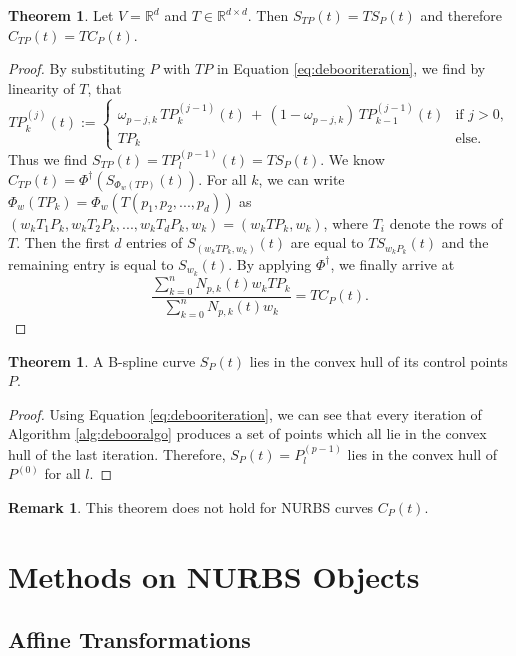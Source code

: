 \documentclass[a4paper, 11pt]{report}
\theoremstyle{definition}
\newtheorem{theorem}[definition]{Theorem}
\newtheorem*{remark}{Remark}
\begin{document}
\begin{theorem}
	Let $V = \mathbb{R}^d$ and $T \in \mathbb{R}^{d \times d}$. Then $S_{TP}(t) = TS_P(t)$ and therefore $C_{TP}(t) = TC_P(t)$.
\end{theorem}
\begin{proof}
	By substituting $P$ with $TP$ in Equation \ref{eq:debooriteration}, we find by linearity of $T$, that
		\begin{equation*}
			TP^{(j)}_k(t) := \begin{cases}
				\omega_{p-j, k} \, TP^{(j-1)}_k(t) \, + \, (1-\omega_{p-j, k}) \, TP^{(j-1)}_{k-1}(t) 	&\text{if } j > 0,\\
				TP_k 																					&\text{else}.
			\end{cases}
		\end{equation*}
	Thus we find $S_{TP}(t) = TP^{(p-1)}_l(t) = TS_P(t)$. We know $C_{TP}(t) = \Phi^\dagger(S_{\Phi_w(TP)}(t))$. For all $k$, we can write $\Phi_w(TP_k) = \Phi_w(T(p_1, p_2, ..., p_d))$ as $(w_kT_1P_k, w_kT_2P_k, ..., w_kT_dP_k, w_k) = (w_kTP_k, w_k)$, where $T_i$ denote the rows of $T$. Then the first $d$ entries of $S_{(w_kTP_k, w_k)}(t)$ are equal to $TS_{w_kP_k}(t)$ and the remaining entry is equal to $S_{w_k}(t)$. By applying $\Phi^\dagger$, we finally arrive at
	\begin{equation*}
		\frac{\sum_{k=0}^n N_{p,k}(t) w_k TP_k}{\sum_{k=0}^n N_{p,k}(t) w_k} = TC_P(t).
	\end{equation*}
\end{proof}

\begin{theorem}
	A B-spline curve $S_P(t)$ lies in the convex hull of its control points $P$.
\end{theorem}
\begin{proof}
	Using Equation \ref{eq:debooriteration}, we can see that every iteration of Algorithm \ref{alg:debooralgo} produces a set of points which all lie in the convex hull of the last iteration. Therefore, $S_P(t) = P^{(p-1)}_l$ lies in the convex hull of $P^{(0)}$ for all $l$.
\end{proof}
\begin{remark}
	This theorem does not hold for NURBS curves $C_P(t)$.
\end{remark}

\section{Methods on NURBS Objects}
\subsection{Affine Transformations}
\end{document}
